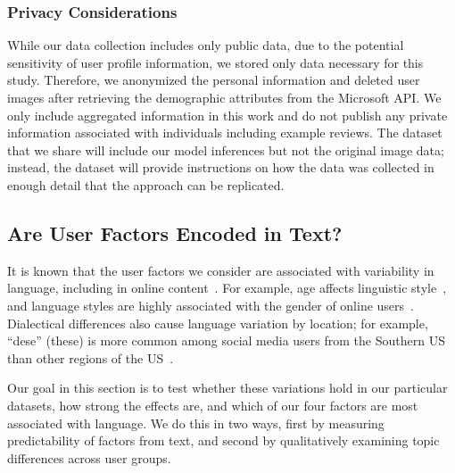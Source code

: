 \subsubsection{Privacy Considerations}

While our data collection includes only public data, 
due to the potential sensitivity of user profile information,
we stored only data necessary for this study.
Therefore, we anonymized the personal information and deleted user images after retrieving the demographic attributes from the Microsoft API. 
We only include aggregated information in this work and do not publish any private information associated with individuals including example reviews. 
The dataset that we share will include our model inferences but not the original image data; instead, the dataset will provide 
instructions on how the data was collected in enough detail that the approach can be replicated.


\subsection{Are User Factors Encoded in Text?}
\label{chap4:subsec:analysis}

It is known that the user factors we consider are associated with variability in language, including in online content~\cite{hovy2015demographic}.
For example, age affects linguistic style~\cite{wagner2012age},
and language styles are highly associated with the gender of online users~\cite{hovy2018capturing}.
Dialectical differences also cause language variation by location;
for example, ``dese'' (these) is more common among social media users from the Southern US than other regions of the US~\cite{goel2016social}.

Our goal in this section is to test
whether these variations hold in our particular datasets,
how strong the effects are,
and which of our four factors are most associated with language.
We do this in two ways,
first by measuring predictability of factors from text,
and second by qualitatively examining topic differences across user groups.


\begin{table}[t]
\centering
{}
\caption{Predictability of user factors from language data. We show the absolute percentage improvements in accuracy over majority-class baselines. For example, the majority-class baselines of accuracy scores are either .500 for the binary prediction or .250 for the region prediction.}
\label{chap4:table:explo}
\end{table}


